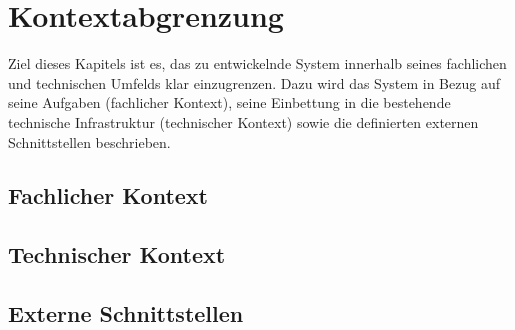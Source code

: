 \chapter{Kontextabgrenzung}
Ziel dieses Kapitels ist es, das zu entwickelnde System innerhalb seines fachlichen und technischen Umfelds klar einzugrenzen. Dazu wird das System in Bezug auf seine Aufgaben (fachlicher Kontext), seine Einbettung in die bestehende technische Infrastruktur (technischer Kontext) sowie die definierten externen Schnittstellen beschrieben.

\section{Fachlicher Kontext}

\section{Technischer Kontext}

\section{Externe Schnittstellen}
